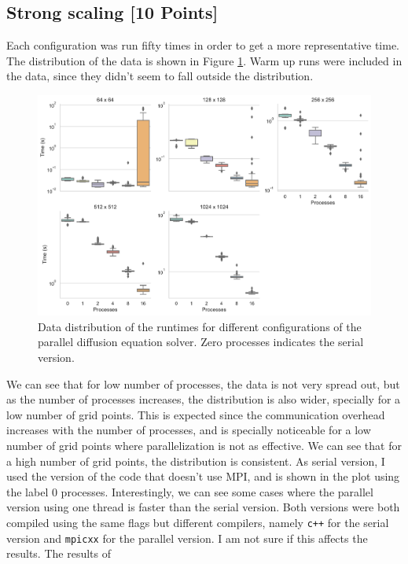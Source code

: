 \documentclass[unicode,11pt,a4paper,oneside,numbers=endperiod,openany]{scrartcl}
\begin{document}
\subsection{Strong scaling [10 Points]}
Each configuration was run fifty times in order to get a more representative
time. The distribution of the data is shown in Figure \ref{fig:data}. Warm up
runs were included in the data, since they didn't seem to fall outside the distribution.
\begin{figure}[h!]
    \centering
    \includegraphics[width=\textwidth]{../mini_app_mpi/data_var_strong.pdf}
    \caption{Data distribution of the runtimes for different configurations of
    the parallel diffusion equation solver. Zero processes indicates the serial version.}
    \label{fig:data}
\end{figure}
We can see that for low number of processes, the data is not very spread out,
but as the number of processes increases, the distribution is also wider,
specially for a low number of grid points. 
This is expected since the
communication overhead increases with the number of processes, and is specially
noticeable for a low number of grid points where parallelization is not as
effective. We can see that for a high number of grid points, the distribution
is consistent. 
As serial version, I used the version of the code that doesn't use MPI, and is
shown in the plot using the label $0$ processes. 
Interestingly, we can see some cases
where the parallel version using one thread is faster than the serial version.
Both versions
were both compiled using the same flags but different compilers, namely \texttt{c++} for
the serial version and \texttt{mpicxx} for the parallel version. I am not sure if this
affects the results.
The results of
\end{document}
